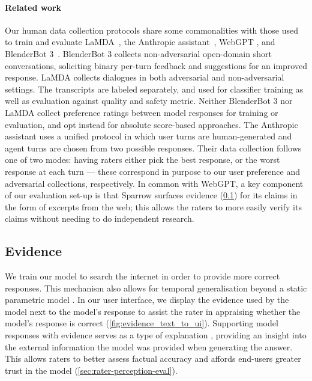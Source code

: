 \paragraph{Related work} Our human data collection protocols share some commonalities with those used to train and evaluate LaMDA~\citep{thoppilan2022lamda}, the Anthropic assistant~\citep{askell2021general, bai2022training}, WebGPT \citep{nakano2021webgpt}, and BlenderBot 3~\citep{blenderbot3}. BlenderBot 3 collects non-adversarial open-domain short conversations, soliciting binary per-turn feedback and suggestions for an improved response. LaMDA collects dialogues in both adversarial and non-adversarial settings. The transcripts are labeled separately, and used for classifier training as well as evaluation against quality and safety metric. Neither BlenderBot 3 nor LaMDA collect preference ratings between model responses for training or evaluation, and opt instead for absolute score-based approaches. The Anthropic assistant uses a unified protocol in which user turns are human-generated and agent turns are chosen from two possible responses. Their data collection follows one of two modes: having raters either pick the best response, or the worst response at each turn --- these correspond in purpose to our user preference and adversarial collections, respectively. In common with WebGPT, a key component of our evaluation set-up is that Sparrow surfaces evidence (\ref{sec:evidence}) for its claims in the form of excerpts from the web; this allows the raters to more easily verify its claims without needing to do independent research.

\subsection{Evidence} \label{sec:evidence}

We train our model to search the internet in order to provide more correct responses. This mechanism also allows for temporal generalisation beyond a static parametric model \citep{liska2022streamingqa,lewis2020retrieval,borgeaud2022retro,shuster2022seeker}. In our user interface, we display the evidence used by the model next to the model's response to assist the rater in appraising whether the model's response is correct (\ref{fig:evidence_text_to_ui}).
Supporting model responses with evidence \citep{menick2022teaching} serves as a type of explanation  \citep{ras2022explainable}, providing an insight into the external information the model was provided when generating the answer. This allows raters to better assess factual accuracy and affords end-users greater trust in the model (\ref{sec:rater-perception-eval}).

